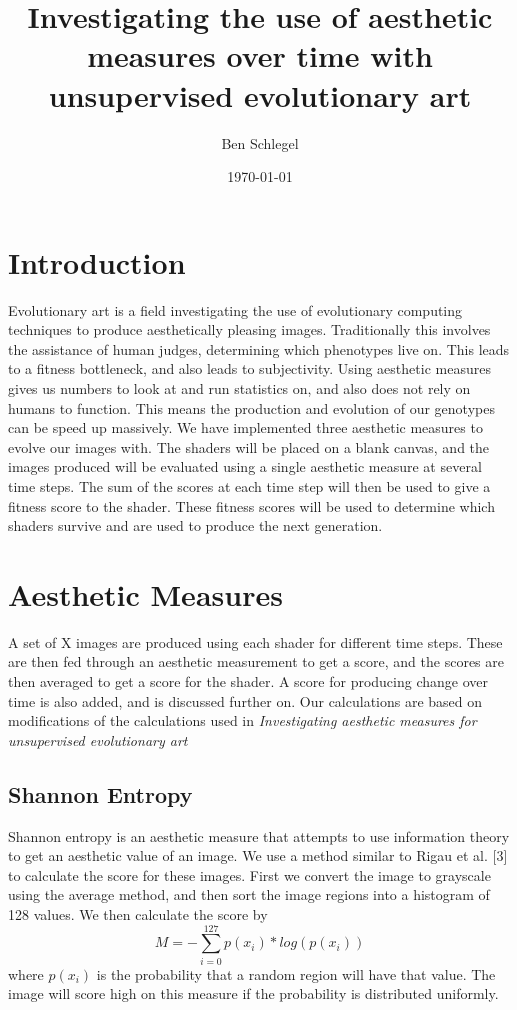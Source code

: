\documentclass{acmart}
\title{Investigating the use of aesthetic measures over time with unsupervised evolutionary art}
\author{Ben Schlegel}
\date{\today}
\begin{document}
\begin{titlepage}
    \maketitle
\end{titlepage}



\graphicspath{{./images/}}

\section*{Introduction}
Evolutionary art is a field investigating the use of evolutionary computing techniques to produce aesthetically pleasing images. Traditionally this involves the assistance of human judges, determining which phenotypes live on. This leads to a fitness bottleneck,
and also leads to subjectivity. Using aesthetic measures gives us numbers to look at and run statistics on, and also does not rely on humans to function. This means the production and evolution of our genotypes can be speed up massively. We have implemented three aesthetic measures to evolve our images with. The shaders will be placed on a blank canvas, and the images produced will be evaluated using a single aesthetic measure at several time steps. The sum of the scores at each time step will then be used to give a fitness score to the shader. These fitness scores will be used to determine which shaders 
survive and are used to produce the next generation.


\section*{Aesthetic Measures}
A set of X images are produced using each shader for different time steps. These are then fed through an aesthetic measurement to get a score, and the scores are then averaged to get a score for the shader. A score for producing change over time is also added, and is discussed further on. Our calculations are based on modifications of the calculations used in \textit{Investigating aesthetic measures for unsupervised evolutionary art}
\subsection*{Shannon Entropy}
Shannon entropy is an aesthetic measure that attempts to use information theory to get an aesthetic value of an image. We use a method similar to Rigau et al. [3] to calculate the score for these images. 
First we convert the image to grayscale using the average method, and then sort the image regions into a histogram of 128 values. We then calculate the score by
\begin{equation*}
    M = - \sum_{i=0}^{127} p(x_i) * log(p(x_i))
\end{equation*}
where $p(x_i)$ is the probability that a random region will have that value. The image will score high on this measure if the probability is distributed uniformly.
\end{document}
